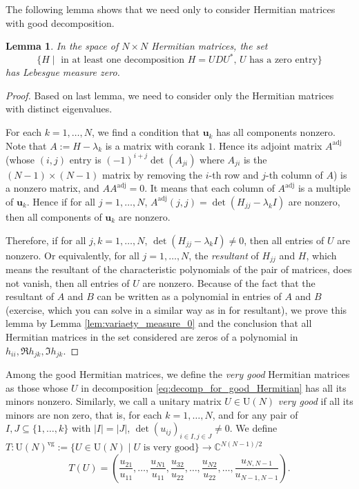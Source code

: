 \documentclass[11pt, a4paper]{article}
\numberwithin{equation}{section}
\newcommand{\compC}{\mathbb{C}}
\newcommand{\Unitary}{\mathrm{U}}
\renewcommand{\vec}[1]{\mathbf{#1}}
\DeclareMathOperator{\adj}{adj}
\DeclareMathOperator{\verygood}{vg}
\newtheorem{lem}{Lemma}
\theoremstyle{definition}
\theoremstyle{remark}
\begin{document}
The following lemma shows that we need only to consider Hermitian matrices with good decomposition.
\begin{lem} \label{lem:nonzero_U}
  In the space of $N \times N$ Hermitian matrices, the set
  \begin{equation}
    \{ H \mid \text{ in at least one decomposition $H = U D U^*$, $U$ has a zero entry} \}
  \end{equation}
  has Lebesgue measure zero.
\end{lem}
\begin{proof}
  Based on last lemma, we need to consider only the Hermitian matrices with distinct eigenvalues.

  For each $k = 1, \dotsc, N$, we find a condition that  $\vec{u}_k$ has all components nonzero. Note that $A := H - \lambda_k$ is a matrix with corank $1$. Hence its adjoint matrix $A^{\adj}$ (whose $(i, j)$ entry is $(-1)^{i + j} \det(A_{ji})$ where $A_{ji}$ is the $(N - 1) \times (N - 1)$ matrix by removing the $i$-th row and $j$-th column of $A$) is a nonzero matrix, and $A A^{\adj} = 0$. It means that each column of $A^{\adj}$ is a multiple of $\vec{u}_k$. Hence if for all $j = 1, \dotsc, N$, $A^{\adj}(j, j) = \det(H_{jj} - \lambda_k I)$ are nonzero, then all components of $\vec{u}_k$ are nonzero.

  Therefore, if for all $j, k = 1, \dotsc, N$, $\det(H_{jj} - \lambda_k I) \neq 0$, then all entries of $U$ are nonzero. Or equivalently, for all $j = 1, \dotsc, N$, the \emph{resultant} of $H_{jj}$ and $H$, which means the resultant of the characteristic polynomials of the pair of matrices, does not vanish, then all entries of $U$ are nonzero. Because of the fact that the resultant of $A$ and $B$ can be written as a polynomial in entries of $A$ and $B$ (exercise, which you can solve in a similar way as in \cite[Exercise 19 in Section 2]{Serre10} for resultant), we prove this lemma by Lemma \ref{lem:variaety_measure_0} and the conclusion that all Hermitian matrices in the set considered are zeros of a polynomial in $h_{ii}, \Re h_{jk}, \Im h_{jk}$.
\end{proof}

Among the good Hermitian matrices, we define the \emph{very good} Hermitian matrices as those whose $U$ in decomposition \eqref{eq:decomp_for_good_Hermitian} has all its minors nonzero. Similarly, we call a unitary matrix $U \in \Unitary(N)$ \emph{very good} if all its minors are non zero, that is, for each $k = 1, \dotsc, N$, and for any pair of $I, J \subseteq \{1, \dotsc, k \}$ with $\lvert I \rvert = \lvert J \rvert$, $\det(u_{ij})_{i \in I, j \in J} \neq 0$. We define $T: \Unitary(N)^{\verygood} := \{ U \in \Unitary(N) \mid \text{$U$ is very good} \} \to \compC^{N(N - 1)/2}$
\begin{equation}
  T(U) = \left( \frac{u_{21}}{u_{11}}, \dotsc, \frac{u_{N1}}{u_{11}}, \frac{u_{32}}{u_{22}}, \dotsc, \frac{u_{N2}}{u_{22}}, \dotsc, \frac{u_{N, N-1}}{u_{N - 1, N - 1}} \right).
\end{equation}
\end{document}
